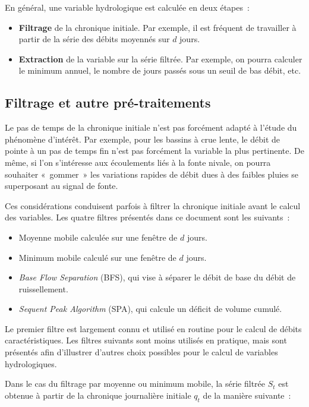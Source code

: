 \documentclass[
]{book}
\providecommand{\tightlist}{%
  \setlength{\itemsep}{0pt}\setlength{\parskip}{0pt}}
\begin{document}
En général, une variable hydrologique est calculée en deux étapes~:

\begin{itemize}
\tightlist
\item
  \textbf{Filtrage} de la chronique initiale. Par exemple, il est fréquent de travailler à partir de la série des débits moyennés sur \(d\) jours.
\item
  \textbf{Extraction} de la variable sur la série filtrée. Par exemple, on pourra calculer le minimum annuel, le nombre de jours passés sous un seuil de bas débit, etc.
\end{itemize}

\subsection{Filtrage et autre pré-traitements}\label{filtrage-et-autre-pruxe9-traitements}

Le pas de temps de la chronique initiale n'est pas forcément adapté à l'étude du phénomène d'intérêt. Par exemple, pour les bassins à crue lente, le débit de pointe à un pas de temps fin n'est pas forcément la variable la plus pertinente. De même, si l'on s'intéresse aux écoulements liés à la fonte nivale, on pourra souhaiter «~gommer~» les variations rapides de débit dues à des faibles pluies se superposant au signal de fonte.

Ces considérations conduisent parfois à filtrer la chronique initiale avant le calcul des variables. Les quatre filtres présentés dans ce document sont les suivants~:

\begin{itemize}
\tightlist
\item
  Moyenne mobile calculée sur une fenêtre de \(d\) jours.
\item
  Minimum mobile calculé sur une fenêtre de \(d\) jours.
\item
  \emph{Base Flow Separation} (BFS), qui vise à séparer le débit de base du débit de ruissellement.
\item
  \emph{Sequent Peak Algorithm} (SPA), qui calcule un déficit de volume cumulé.
\end{itemize}

Le premier filtre est largement connu et utilisé en routine pour le calcul de débits caractéristiques. Les filtres suivants sont moins utilisés en pratique, mais sont présentés afin d'illustrer d'autres choix possibles pour le calcul de variables hydrologiques.

Dans le cas du filtrage par moyenne ou minimum mobile, la série filtrée \(S_t\) est obtenue à partir de la chronique journalière initiale \(q_t\) de la manière suivante~:
\end{document}
